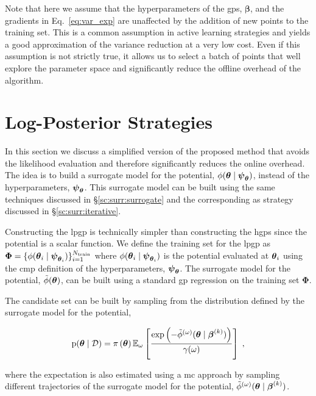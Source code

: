 \smallskip
Note that here we assume that the hyperparameters of the \glspl{gp}, $\boldsymbol{\beta}$, and the gradients in Eq.~\eqref{eq:var_exp} are unaffected by the addition of new points to the training set. This is a common assumption in active learning strategies and yields a good approximation of the variance reduction at a very low cost. Even if this assumption is not strictly true, it allows us to select a batch of points that well explore the parameter space and significantly reduce the offline overhead of the algorithm.

\section{Log-Posterior Strategies}
\label{sc:surr:lpgp}
In this section we discuss a simplified version of the proposed method that avoids the likelihood evaluation and therefore significantly reduces the online overhead. The idea is to build a surrogate model for the potential, $\phi(\boldsymbol{\theta} \mid \boldsymbol{\psi}_{\boldsymbol{\theta}})$, instead of the hyperparameters, $\boldsymbol{\psi}_{\boldsymbol{\theta}}$. This surrogate model can be built using the same techniques discussed in \S\ref{sc:surr:surrogate} and the corresponding \gls{as} strategy discussed in \S\ref{sc:surr:iterative}. 

\smallskip
Constructing the \gls{lpgp} is technically simpler than constructing the \glspl{hgp} since the potential is a scalar function. We define the training set for the \gls{lpgp} as $\boldsymbol{\Phi} = \{\phi(\boldsymbol{\theta}_i \mid \boldsymbol{\psi}_{\boldsymbol{\theta}_i})\}_{i=1}^{N_{\mathrm{train}}}$ where $\phi(\boldsymbol{\theta}_i \mid \boldsymbol{\psi}_{\boldsymbol{\theta}_i})$ is the potential evaluated at $\boldsymbol{\theta}_i$ using the \gls{cmp} definition of the hyperparameters, $\boldsymbol{\psi}_{\boldsymbol{\theta}}$. The surrogate model for the potential, $\tilde{\phi}(\boldsymbol{\theta})$, can be built using a standard \gls{gp} regression on the training set $\boldsymbol{\Phi}$. 

\smallskip
The candidate set can be built by sampling from the distribution defined by the surrogate model for the potential, 

\begin{equation}
  \mathrm{p}(\boldsymbol{\theta} \mid \mathcal{D}) = \pi \left( \boldsymbol{\theta}\right) \mathbb{E}_{\omega} \left[ \dfrac{\exp \left(-\tilde{\phi}^{(\omega)}(\boldsymbol{\theta} \mid \boldsymbol{\beta}^{(k)}) \right)}{\gamma(\omega)} \right] \;,
\end{equation}

where the expectation is also estimated using a \gls{mc} approach by sampling different trajectories of the surrogate model for the potential, $\tilde{\phi}^{(\omega)}(\boldsymbol{\theta} \mid \boldsymbol{\beta}^{(k)})$. 


